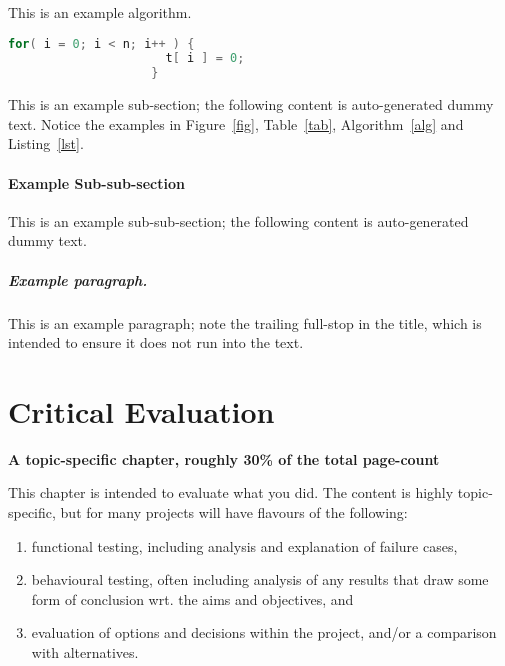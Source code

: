 \documentclass[ %
                    author={James Stephenson},
                supervisor={Dr. Edwin Simpson},
                    degree={MSc},
                     title={Bayesian Deep Learning For Extractive Test Summarisation},
                  subtitle={},
                      type={},
                      year={2023}]{../additions/dissertation}
\begin{document}
				\begin{algorithm}[t]
					\caption{This is an example algorithm.}
					\label{alg}
				\end{algorithm}
				
				\begin{lstlisting}[float={t},caption={This is an example listing.},label={lst},language=C]
					for( i = 0; i < n; i++ ) {
					  t[ i ] = 0;
					}
				\end{lstlisting}
				
				This is an example sub-section;
				the following content is auto-generated dummy text.
				Notice the examples in Figure~\ref{fig}, Table~\ref{tab}, Algorithm~\ref{alg}
				and Listing~\ref{lst}.
				\lipsum
				
				\subsubsection{Example Sub-sub-section}
				
					This is an example sub-sub-section;
					the following content is auto-generated dummy text.
					\lipsum
					
					\paragraph{Example paragraph.}
					
						This is an example paragraph; note the trailing full-stop in the title,
						which is intended to ensure it does not run into the text.
					
		
	\chapter{Critical Evaluation}
		\label{chap:evaluation}
		
		{\bf A topic-specific chapter, roughly 30\% of the total page-count} 
		\vspace{1cm} 
		
		\noindent
		This chapter is intended to evaluate what you did.  The content is highly 
		topic-specific, but for many projects will have flavours of the following:
		
		\begin{enumerate}
			\item functional  testing, including analysis and explanation of failure 
			      cases,
			\item behavioural testing, often including analysis of any results that 
			      draw some form of conclusion wrt. the aims and objectives,
			      and
			\item evaluation of options and decisions within the project, and/or a
			      comparison with alternatives.
		\end{enumerate}
		
\end{document}
